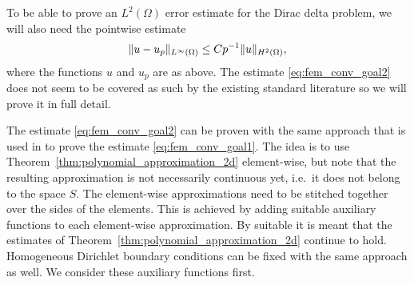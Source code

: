 \documentclass[english, 12pt, a4paper, sci, utf8, a-2b, online]{aaltothesis}
\theoremstyle{definition}
\theoremstyle{plain}
\DeclarePairedDelimiter\norm{\lVert}{\rVert}
\numberwithin{equation}{section}
\begin{document}
To be able to prove an $L^2(\Omega)$ error estimate for the Dirac delta problem,
we will also need the pointwise estimate
\begin{equation}
    \label{eq:fem_conv_goal2}
    \norm{u-u_p}_{L^{\infty}(\Omega)} \leq C p^{-1} \norm{u}_{H^2(\Omega)},
\end{equation}
where the functions $u$ and $u_p$ are as above.
The estimate \eqref{eq:fem_conv_goal2} does not seem to be covered as such
by the existing standard literature so we will prove it in full detail.

The estimate \eqref{eq:fem_conv_goal2} can be proven with the same approach that
is used in \cite{babuskasuri1987} to prove the estimate \eqref{eq:fem_conv_goal1}.
The idea is to use Theorem~\ref{thm:polynomial_approximation_2d} element-wise,
but note that the resulting approximation is not necessarily continuous yet, i.e.\ it does not
belong to the space $S$. The element-wise approximations need to be
stitched together over the sides of the elements. This is achieved by adding suitable
auxiliary functions to each element-wise approximation. By suitable it is meant
that the estimates of Theorem~\ref{thm:polynomial_approximation_2d} continue to hold.
Homogeneous Dirichlet boundary conditions can be fixed with the same approach as well.
We consider these auxiliary functions first.
\end{document}
